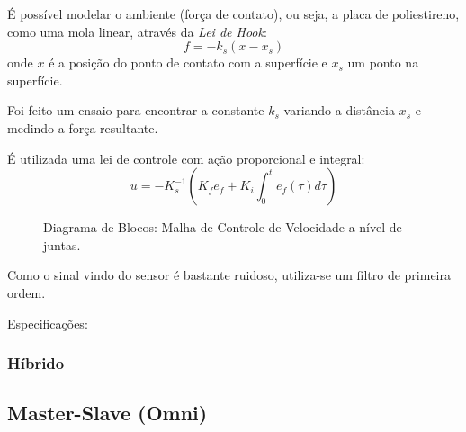 É possível modelar o ambiente (força de contato), ou seja, a placa de poliestireno, como uma mola linear, através da \textit{Lei de Hook}: \cite{bib:toni}
\begin{equation}
f = -k_s (x - x_s)
\end{equation}
onde $x$ é a posição do ponto de contato com a superfície e $x_s$ um ponto na superfície.

Foi feito um ensaio para encontrar a constante $k_s$ variando a distância $x_s$ e medindo a força resultante.


É utilizada uma lei de controle com ação proporcional e integral:
\begin{equation}
u = -K_s^{-1} (K_fe_f + K_i \int_0^t e_f(\tau)d\tau)
\end{equation}

\begin{figure}[h!]
\centering
{}
\caption{Diagrama de Blocos: Malha de Controle de Velocidade a nível de juntas.}
\label{fig:controlejuntas}
\end{figure}

Como o sinal vindo do sensor é bastante ruidoso, utiliza-se um filtro de primeira ordem.

Especificações:

\subsubsection{Híbrido}

\subsection{Master-Slave (Omni)}
